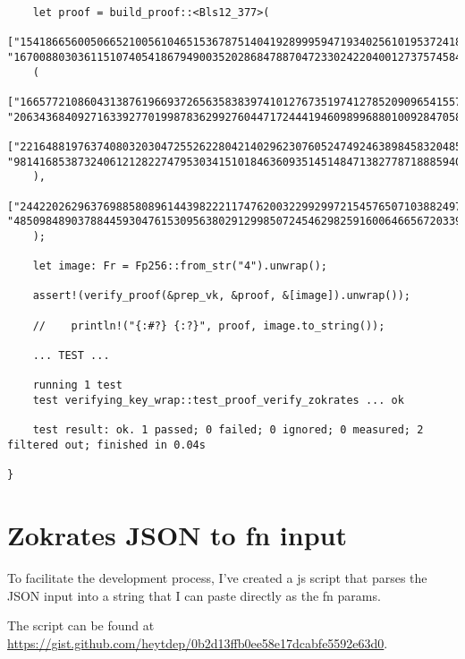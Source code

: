 \documentclass{article}
\begin{document}
\begin{lstlisting}
    let proof = build_proof::<Bls12_377>(
	["15418665600506652100561046515367875140419289995947193402561019537241872027964827224166724343705483346143470852731", "167008803036115107405418679490035202868478870472330242204001273757458478058714648975048495328133467760891608546148"],
	(
	    ["166577210860431387619669372656358383974101276735197412785209096541557319817228478432621330273001881927051445417406", "206343684092716339277019987836299276044717244419460989968801009284705815340411102589748352273738828474466157094245"],
	    ["221648819763740803203047255262280421402962307605247492463898458320485549262445592950081729098224237965423853570558", "98141685387324061212822747953034151018463609351451484713827787188859406641166893569975083223024556896317502938904"]
	),
	["244220262963769885808961443982221174762003229929972154576507103882497536855742220170129599313242682265347284028286", "48509848903788445930476153095638029129985072454629825916006466567203396769632018246628830229692992210820821493168"]
    );

    let image: Fr = Fp256::from_str("4").unwrap();

    assert!(verify_proof(&prep_vk, &proof, &[image]).unwrap());

    //    println!("{:#?} {:?}", proof, image.to_string());

    ... TEST ...

    running 1 test
    test verifying_key_wrap::test_proof_verify_zokrates ... ok

    test result: ok. 1 passed; 0 failed; 0 ignored; 0 measured; 2 filtered out; finished in 0.04s

}

\end{lstlisting}

\section{Zokrates JSON to fn input}
To facilitate the development process, I've created a js script that parses the JSON input into a string that I can paste directly as the fn params.

The script can be found at \url{https://gist.github.com/heytdep/0b2d13ffb0ee58e17dcabfe5592e63d0}.
\end{document}
